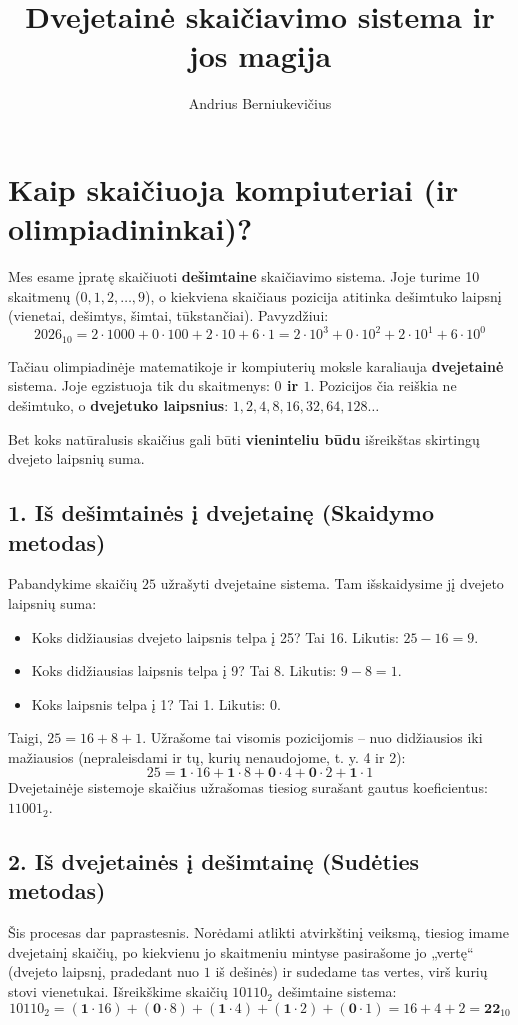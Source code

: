 \documentclass[11pt,a4paper]{scrartcl}
\title{Dvejetainė skaičiavimo sistema ir jos magija}
\author{Andrius Berniukevičius}
\begin{document}
\maketitle

\section{Kaip skaičiuoja kompiuteriai (ir olimpiadininkai)?}

Mes esame įpratę skaičiuoti \textbf{dešimtaine} skaičiavimo sistema. Joje turime 10 skaitmenų ($0, 1, 2, \dots, 9$), o kiekviena skaičiaus pozicija atitinka dešimtuko laipsnį (vienetai, dešimtys, šimtai, tūkstančiai). Pavyzdžiui:
\[ 2026_{10} = 2 \cdot 1000 + 0 \cdot 100 + 2 \cdot 10 + 6 \cdot 1 = 2 \cdot 10^3 + 0 \cdot 10^2 + 2 \cdot 10^1 + 6 \cdot 10^0 \]

Tačiau olimpiadinėje matematikoje ir kompiuterių moksle karaliauja \textbf{dvejetainė} sistema. Joje egzistuoja tik du skaitmenys: \textbf{$0$ ir $1$}. Pozicijos čia reiškia ne dešimtuko, o \textbf{dvejetuko laipsnius}: $1, 2, 4, 8, 16, 32, 64, 128 \dots$

Bet koks natūralusis skaičius gali būti \textbf{vieninteliu būdu} išreikštas skirtingų dvejeto laipsnių suma. 

\subsection*{1. Iš dešimtainės į dvejetainę (Skaidymo metodas)}
Pabandykime skaičių $25$ užrašyti dvejetaine sistema. Tam išskaidysime jį dvejeto laipsnių suma:
\begin{itemize}
    \item Koks didžiausias dvejeto laipsnis telpa į 25? Tai 16. Likutis: $25 - 16 = 9$.
    \item Koks didžiausias laipsnis telpa į 9? Tai 8. Likutis: $9 - 8 = 1$.
    \item Koks laipsnis telpa į 1? Tai 1. Likutis: 0.
\end{itemize}
Taigi, $25 = 16 + 8 + 1$. Užrašome tai visomis pozicijomis – nuo didžiausios iki mažiausios (nepraleisdami ir tų, kurių nenaudojome, t. y. 4 ir 2):
\[ 25 = \mathbf{1} \cdot 16 + \mathbf{1} \cdot 8 + \mathbf{0} \cdot 4 + \mathbf{0} \cdot 2 + \mathbf{1} \cdot 1 \]
Dvejetainėje sistemoje skaičius užrašomas tiesiog surašant gautus koeficientus: \textbf{$11001_2$}.

\subsection*{2. Iš dvejetainės į dešimtainę (Sudėties metodas)}
Šis procesas dar paprastesnis. Norėdami atlikti atvirkštinį veiksmą, tiesiog imame dvejetainį skaičių, po kiekvienu jo skaitmeniu mintyse pasirašome jo „vertę“ (dvejeto laipsnį, pradedant nuo $1$ iš dešinės) ir sudedame tas vertes, virš kurių stovi vienetukai.
Išreikškime skaičių $10110_2$ dešimtaine sistema:
\[ 10110_2 = (\mathbf{1} \cdot 16) + (\mathbf{0} \cdot 8) + (\mathbf{1} \cdot 4) + (\mathbf{1} \cdot 2) + (\mathbf{0} \cdot 1) = 16 + 4 + 2 = \textbf{22}_{10} \]
\end{document}
